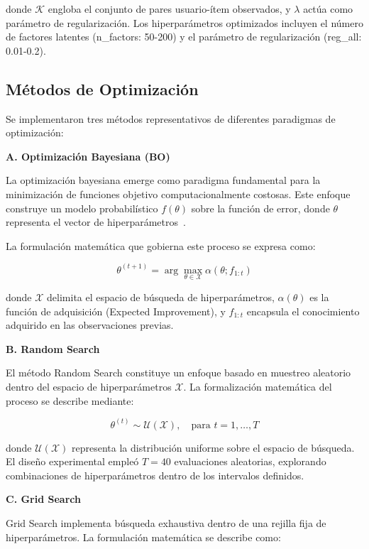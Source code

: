 \documentclass[conference]{IEEEtran}
\begin{document}
donde $\mathcal{K}$ engloba el conjunto de pares usuario-ítem observados, y $\lambda$ actúa como parámetro de regularización. Los hiperparámetros optimizados incluyen el número de factores latentes (n\_factors: 50-200) y el parámetro de regularización (reg\_all: 0.01-0.2).

\subsection{Métodos de Optimización}

Se implementaron tres métodos representativos de diferentes paradigmas de optimización:

\textbf{A. Optimización Bayesiana (BO)}

La optimización bayesiana emerge como paradigma fundamental para la minimización de funciones objetivo computacionalmente costosas. Este enfoque construye un modelo probabilístico $f(\theta)$ sobre la función de error, donde $\theta$ representa el vector de hiperparámetros~\cite{b7}.

La formulación matemática que gobierna este proceso se expresa como:

\begin{equation}
\theta^{(t+1)} = \arg\max_{\theta \in \mathcal{X}} \alpha(\theta; f_{1:t})
\end{equation}

donde $\mathcal{X}$ delimita el espacio de búsqueda de hiperparámetros, $\alpha(\theta)$ es la función de adquisición (Expected Improvement), y $f_{1:t}$ encapsula el conocimiento adquirido en las observaciones previas.

\textbf{B. Random Search}

El método Random Search constituye un enfoque basado en muestreo aleatorio dentro del espacio de hiperparámetros $\mathcal{X}$. La formalización matemática del proceso se describe mediante:

\begin{equation}
\theta^{(t)} \sim \mathcal{U}(\mathcal{X}), \quad \text{para } t = 1, \dots, T
\end{equation}

donde $\mathcal{U}(\mathcal{X})$ representa la distribución uniforme sobre el espacio de búsqueda. El diseño experimental empleó $T = 40$ evaluaciones aleatorias, explorando combinaciones de hiperparámetros dentro de los intervalos definidos.

\textbf{C. Grid Search}

Grid Search implementa búsqueda exhaustiva dentro de una rejilla fija de hiperparámetros. La formulación matemática se describe como:
\end{document}
